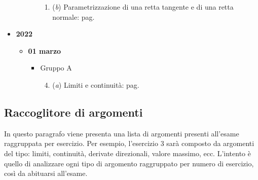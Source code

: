 \documentclass[a4paper]{article}
\begin{document}
\begin{itemize}
\begin{itemize}
\begin{itemize}
\begin{enumerate}[label*=Ex. \arabic*), leftmargin = 4em]
					\item (\emph{b}) Parametrizzazione di una retta tangente e di una retta normale: pag.~\hyperlink{
						exam: esame 06 settembre 2023 - Gruppo A - 4 esercizio (b)
					}{
					}
				\end{enumerate}
			\end{itemize}
		\end{itemize}

		\item \textbf{2022}
		\begin{itemize}
			\item \textbf{01 marzo}
			\begin{itemize}
				\item Gruppo A
				\begin{enumerate}[label*=Ex. \arabic*), leftmargin = 4em]
					\setcounter{enumi}{3}
					\item (\emph{a}) Limiti e continuità: pag.~\hyperlink{
						exam: esame 01 marzo 2022 - Gruppo A - 4 esercizio (a)
					}{
					}
				\end{enumerate}
			\end{itemize}
		\end{itemize}
	\end{itemize}

	\newpage

	\subsection{Raccoglitore di argomenti}

	In questo paragrafo viene presenta una lista di argomenti presenti all'esame raggruppata per esercizio. Per esempio, l'esercizio 3 sarà composto da argomenti del tipo: limiti, continuità, derivate direzionali, valore massimo, ecc. L'intento è quello di analizzare ogni tipo di argomento raggruppato per numero di esercizio, così da abituarsi all'esame.
\end{document}
